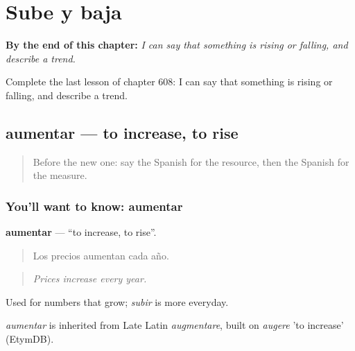 
\chapter{Sube y baja}
\label{ch:es-sube-y-baja}

\begin{chapteropening}
\textbf{By the end of this chapter:} \emph{I can say that something is rising or falling, and describe a trend.}

Complete the last lesson of chapter 608: I can say that something is rising or falling, and describe a trend.
\end{chapteropening}

\section[aumentar]{aumentar — to increase, to rise}

\label{lesson:ES-C608-aumentar}



\begin{quote}
Before the new one: say the Spanish for the resource, then the Spanish for the measure.
\end{quote}

\subsection*{You'll want to know: aumentar}
\textbf{aumentar} — \textquotedblleft{}to increase, to rise\textquotedblright{}.

\begin{quote}
Los precios aumentan cada año.
\end{quote}

\begin{quote}
\emph{Prices increase every year.}
\end{quote}

Used for numbers that grow; \emph{subir} is more everyday.

\begin{cousinweb}
\emph{aumentar} is inherited from Late Latin \emph{augmentare}, built on \emph{augere} 'to increase' (EtymDB).
\end{cousinweb}

